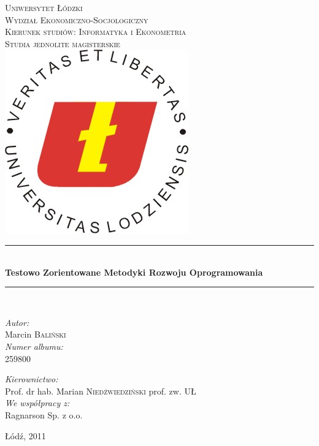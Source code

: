 \begin{titlepage}

\begin{center}
  
\newcommand{\HRule}{\rule{\linewidth}{0.5mm}}

\textsc{\LARGE Uniwersytet Łódzki}\\[0.5cm]

\textsc{\Large Wydział Ekonomiczno-Socjologiczny}\\[0.5cm]

\textsc{\Large Kierunek studiów: Informatyka i Ekonometria}\\[0.5cm]

\textsc{\Large Studia jednolite magisterskie}\\[2cm]

\includegraphics[scale=3.5]{images/ul-logo.jpg}\\[2cm]   



\HRule \\[0.4cm]
{\huge \bfseries Testowo Zorientowane Metodyki Rozwoju Oprogramowania}\\[0.5cm]
\HRule \\[0.4cm]



\begin{minipage}[t]{0.4\textwidth}
\begin{flushleft}
\emph{Autor:}\\
Marcin \textsc{Baliński}\\
\emph{Numer albumu:}\\
\textsc{259800}
\end{flushleft}
\end{minipage}
\begin{minipage}[t]{0.4\textwidth}
\begin{flushright}
\emph{Kierownictwo:} \\
Prof. dr hab. Marian \textsc{Niedźwiedziński} prof. zw. UŁ \\[0.5cm]
\emph{We współpracy z:}\\
Ragnarson Sp. z o.o.
\end{flushright}
\end{minipage}

\vfill

{\large Łódź, 2011}

\end{center}

\end{titlepage}